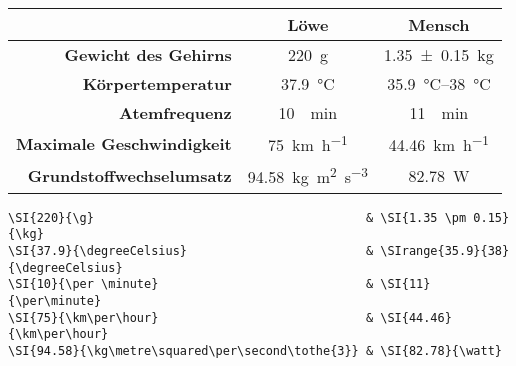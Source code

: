 \documentclass["WS\space 16-17\space -\space LaTeX-Kurs\space -\space Praesentation\space -\space 3.tex"]{subfiles}
\begin{document}
\begin{frame}[fragile]
	\Losung
	\begin{outputbox}
		\vspace{-0.1cm}
		\begin{center}
			\begin{tabular}{rcc}
				\hline
				&	\textbf{Löwe}										& \textbf{Mensch} 						\\ \hline
				\textbf{Gewicht des Gehirns}		&	\SI{220}{\g}										& \SI{1.35 \pm 0.15}{\kg}				\\ 
				\textbf{Körpertemperatur}			&	\SI{37.9}{\degreeCelsius}							& \SIrange{35.9}{38}{\degreeCelsius}	\\
				\textbf{Atemfrequenz}				&	\SI{10}{\per \minute}								& \SI{11}{\per\minute} 					\\
				\textbf{Maximale Geschwindigkeit}	&	\SI{75}{\km\per\hour}								& \SI{44.46}{\km\per\hour} 				\\ 
				\textbf{Grundstoffwechselumsatz}	&	\SI{94.58}{\kg\metre\squared\per\second\tothe{3}}	&  \SI{82.78}{\watt}\\
				\hline
			\end{tabular}
		\end{center}
		\vspace{-0.1cm}
	\end{outputbox}

	\Code
	\begin{lstlisting}[tabsize=1,breaklines=false]
\SI{220}{\g}                                      & \SI{1.35 \pm 0.15}{\kg}
\SI{37.9}{\degreeCelsius}                         & \SIrange{35.9}{38}{\degreeCelsius}
\SI{10}{\per \minute}                             & \SI{11}{\per\minute}
\SI{75}{\km\per\hour}                             & \SI{44.46}{\km\per\hour}
\SI{94.58}{\kg\metre\squared\per\second\tothe{3}} & \SI{82.78}{\watt}
	\end{lstlisting}
\end{frame}
\end{document}
